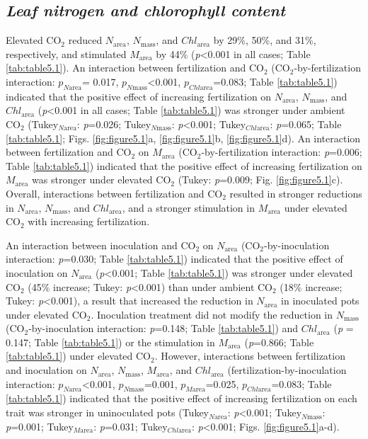 \subsection{\textit{Leaf nitrogen and chlorophyll content}}
\noindent Elevated CO$_2$ reduced $N_\mathrm{area}$, $N_\mathrm{mass}$, and $Chl_\mathrm{area}$ by 29\%, 50\%, and 31\%, respectively, and stimulated $M_\mathrm{area}$ by 44\% (\textit{p}<0.001 in all cases; Table \ref{tab:table5.1}). An interaction between fertilization and CO$_2$ (CO$_2$-by-fertilization interaction: $p_{N\mathrm{area}}$= 0.017, $p_{N\mathrm{mass}}$<0.001, $p_{Chl\mathrm{area}}$=0.083; Table \ref{tab:table5.1}) indicated that the positive effect of increasing fertilization on $N_\mathrm{area}$, $N_\mathrm{mass}$, and $Chl_\mathrm{area}$ (\textit{p}<0.001 in all cases; Table \ref{tab:table5.1}) was stronger under ambient CO$_2$ (Tukey$_{N\mathrm{area}}$: \textit{p}=0.026; Tukey$_{N\mathrm{mass}}$: \textit{p}<0.001; Tukey$_{Chl\mathrm{area}}$: \textit{p}=0.065; Table \ref{tab:table5.1}; Figs. \ref{fig:figure5.1}a, \ref{fig:figure5.1}b, \ref{fig:figure5.1}d). An interaction between fertilization and CO$_2$ on $M_\mathrm{area}$ (CO$_2$-by-fertilization interaction: \textit{p}=0.006; Table \ref{tab:table5.1}) indicated that the positive effect of increasing fertilization on $M_\mathrm{area}$ was stronger under elevated CO$_2$ (Tukey: \textit{p}=0.009; Fig. \ref{fig:figure5.1}c). Overall, interactions between fertilization and CO$_2$ resulted in stronger reductions in $N_\mathrm{area}$, $N_\mathrm{mass}$, and $Chl_\mathrm{area}$, and a stronger stimulation in $M_\mathrm{area}$ under elevated CO$_2$ with increasing fertilization. 

An interaction between inoculation and CO$_2$ on $N_\mathrm{area}$ (CO$_2$-by-inoculation interaction: \textit{p}=0.030; Table \ref{tab:table5.1}) indicated that the positive effect of inoculation on $N_\mathrm{area}$ (\textit{p}<0.001; Table \ref{tab:table5.1}) was stronger under elevated CO$_2$ (45\% increase; Tukey: \textit{p}<0.001) than under ambient CO$_2$ (18\% increase; Tukey: \textit{p}<0.001), a result that increased the reduction in $N_\mathrm{area}$ in inoculated pots under elevated CO$_2$. Inoculation treatment did not modify the reduction in $N_\mathrm{mass}$ (CO$_2$-by-inoculation interaction: \textit{p}=0.148; Table \ref{tab:table5.1}) and $Chl_\mathrm{area}$ (\textit{p} = 0.147; Table \ref{tab:table5.1}) or the stimulation in $M_\mathrm{area}$ (\textit{p}=0.866; Table \ref{tab:table5.1}) under elevated CO$_2$. However, interactions between fertilization and inoculation on $N_\mathrm{area}$, $N_\mathrm{mass}$, $M_\mathrm{area}$, and $Chl_\mathrm{area}$ (fertilization-by-inoculation interaction: $p_{N\mathrm{area}}$<0.001, $p_{N\mathrm{mass}}$=0.001, $p_{M\mathrm{area}}$=0.025, $p_{Chl\mathrm{area}}$=0.083; Table \ref{tab:table5.1}) indicated that the positive effect of increasing fertilization on each trait was stronger in uninoculated pots (Tukey$_{N\mathrm{area}}$: \textit{p}<0.001; Tukey$_{N\mathrm{mass}}$: \textit{p}=0.001; Tukey$_{M\mathrm{area}}$: \textit{p}=0.031; Tukey$_{Chl\mathrm{area}}$: \textit{p}<0.001; Figs. \ref{fig:figure5.1}a-d).

